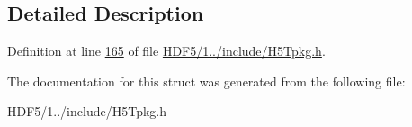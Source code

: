 \subsection{Detailed Description}


Definition at line \hyperlink{_h_d_f5_21_810_81_2include_2_h5_tpkg_8h_source_l00165}{165} of file \hyperlink{_h_d_f5_21_810_81_2include_2_h5_tpkg_8h_source}{H\+D\+F5/1../include/\+H5\+Tpkg.\+h}.



The documentation for this struct was generated from the following file\+:\begin{DoxyCompactItemize}
\item 
H\+D\+F5/1../include/\+H5\+Tpkg.\+h\end{DoxyCompactItemize}
